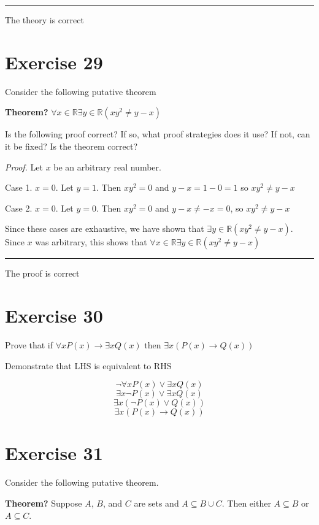 \documentclass[11pt]{article}
\newcommand{\then}{\rightarrow}
\begin{document}
\par\noindent\rule{\textwidth}{0.4pt}

The theory is correct %

\section*{Exercise 29}

Consider the following putative theorem 

\textbf{Theorem?} $\forall x \in \mathbb{R} \exists y \in \mathbb{R} ( x y^2 \neq y - x)$

Is the following proof correct? If so, what proof strategies does it use? If not, 
can it be fixed? Is the theorem correct?

\textit{Proof.} Let $x$ be an arbitrary real number.

Case 1. $x = 0$. Let $y = 1$. Then $xy^2 = 0$ and $y - x = 1 - 0 = 1$ 
so $xy^2 \neq y - x$

Case 2. $x = 0$. Let $y = 0$. Then $xy^2 = 0$ and $y - x \neq -x = 0$, 
so $xy^2 \neq y - x$

Since these cases are exhaustive, we have shown that 
$\exists y \in \mathbb{R} (xy^2 \neq y - x)$. Since $x$ was arbitrary, this shows 
that $\forall x \in \mathbb{R} \exists y \in \mathbb{R} (x y^2 \neq y - x)$

\par\noindent\rule{\textwidth}{0.4pt}

The proof is correct %

\section*{Exercise 30}

Prove that if $\forall x P(x) \then \exists x Q(x)$ then 
$\exists x (P(x) \then Q(x))$

Demonstrate that LHS is equivalent to RHS

$$\neg \forall x P(x) \vee \exists x Q(x)$$
$$\exists x \neg P(x) \vee \exists x Q(x)$$
$$\exists x (\neg P(x) \vee Q(x))$$
$$\exists x (P(x) \then Q(x))$$

\section*{Exercise 31}

Consider the following putative theorem.

\textbf{Theorem?} Suppose $A$, $B$, and $C$ are sets and $A \subseteq B \cup C$.
Then either $A \subseteq B$ or $A \subseteq C$.
\end{document}
